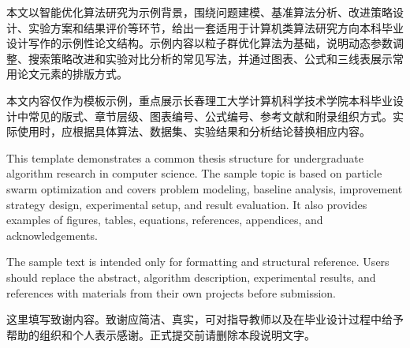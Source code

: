 \documentclass{custhesis}
\begin{document}
\makecustcover
\makecustdeclaration

\custfrontmatter

\begin{custcnabstract}
本文以智能优化算法研究为示例背景，围绕问题建模、基准算法分析、改进策略设计、实验方案和结果评价等环节，给出一套适用于计算机类算法研究方向本科毕业设计写作的示例性论文结构。示例内容以粒子群优化算法为基础，说明动态参数调整、搜索策略改进和实验对比分析的常见写法，并通过图表、公式和三线表展示常用论文元素的排版方式。

本文内容仅作为模板示例，重点展示长春理工大学计算机科学技术学院本科毕业设计中常见的版式、章节层级、图表编号、公式编号、参考文献和附录组织方式。实际使用时，应根据具体算法、数据集、实验结果和分析结论替换相应内容。
\end{custcnabstract}

\begin{custenabstract}
This template demonstrates a common thesis structure for undergraduate algorithm research in computer science. The sample topic is based on particle swarm optimization and covers problem modeling, baseline analysis, improvement strategy design, experimental setup, and result evaluation. It also provides examples of figures, tables, equations, references, appendices, and acknowledgements.

The sample text is intended only for formatting and structural reference. Users should replace the abstract, algorithm description, experimental results, and references with materials from their own projects before submission.
\end{custenabstract}

\custtableofcontents

\custmainmatter





\nocite{gbt7714-2015}

\custappendixstart


\begin{custacknowledgements}
这里填写致谢内容。致谢应简洁、真实，可对指导教师以及在毕业设计过程中给予帮助的组织和个人表示感谢。正式提交前请删除本段说明文字。
\end{custacknowledgements}
\end{document}
